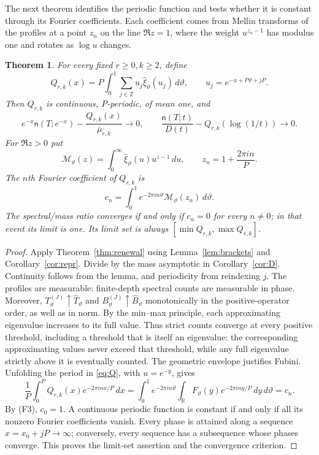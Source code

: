 \documentclass[11pt]{article}
\newtheorem{theorem}{Theorem}[section]
\theoremstyle{definition}
\theoremstyle{remark}
\newcommand{\Z}{\mathbb Z}
\newcommand{\R}{\mathbb R}
\newcommand{\ncount}{\mathsf n}
\begin{document}
The next theorem identifies the periodic function and tests whether it
is constant through its Fourier coefficients. Each coefficient comes
from Mellin transforms of the profiles at a point $z_n$ on the line
$\Re z=1$, where the weight $u^{z_n-1}$ has modulus one and rotates as
$\log u$ changes.
\begin{theorem}\label{thm:periodic}
For every fixed $r\ge0,k\ge2$, define
\begin{equation}\label{eq:Q}
 Q_{r,k}(x)=P\int_0^1\sum_{j\in\Z}
 u_j\widehat\xi_\vartheta(u_j)\,d\vartheta,
 \qquad u_j=e^{-x+P\vartheta+jP}.
\end{equation}
Then $Q_{r,k}$ is continuous, $P$-periodic, of mean one, and
\[
 e^{-x}\ncount(T;e^{-x})-\frac{Q_{r,k}(x)}{\bar\mu_{r,k}}\longrightarrow0,
 \qquad
 \frac{\ncount(T;t)}{D(t)}-Q_{r,k}(\log(1/t))\longrightarrow0.
\]
For $\Re z>0$ put
\[
 \mathcal M_\vartheta(z)=\int_0^\infty
 \widehat\xi_\vartheta(u)u^{z-1}\,du,\qquad
 z_n=1+\frac{2\pi in}{P}.
\]
The $n$th Fourier coefficient of $Q_{r,k}$ is
\begin{equation}\label{eq:cn}
 c_n=\int_0^1e^{-2\pi in\vartheta}
 \mathcal M_\vartheta(z_n)\,d\vartheta.
\end{equation}
The spectral/mass ratio converges if and only if $c_n=0$ for every
$n\ne0$; in that event its limit is one. Its limit set is always
$[\min Q_{r,k},\max Q_{r,k}]$.
\end{theorem}
\begin{proof}
Apply Theorem~\ref{thm:renewal} using Lemma~\ref{lem:brackets} and
Corollary~\ref{cor:repr}. Divide by the mass asymptotic in
Corollary~\ref{cor:D}. Continuity follows from the lemma, and periodicity
from reindexing $j$. The profiles are measurable: finite-depth spectral
counts are measurable in phase. Moreover,
$T_\vartheta^{(J)}\uparrow\widehat T_\vartheta$ and
$B_\vartheta^{(J)}\uparrow\widehat B_\vartheta$ monotonically in the
positive-operator order, as well as in norm. By the min--max principle,
each approximating eigenvalue increases to its full value. Thus strict
counts converge at every positive threshold, including a threshold
that is itself an eigenvalue: the corresponding approximating values
never exceed that threshold, while any full eigenvalue strictly above
it is eventually counted. The geometric envelope justifies Fubini.
Unfolding the period in \eqref{eq:Q}, with $u=e^{-y}$, gives
\[
 \frac1P\int_0^P Q_{r,k}(x)e^{-2\pi inx/P}\,dx
 =\int_0^1e^{-2\pi in\vartheta}
 \int_\R F_\vartheta(y)e^{-2\pi iny/P}\,dy\,d\vartheta
 =c_n.
\]
By (F3), $c_0=1$. A continuous periodic function is constant if and
only if all its nonzero Fourier coefficients vanish. Every phase is
attained along a sequence $x=x_0+jP\to\infty$; conversely, every
sequence has a subsequence whose phases converge. This proves the
limit-set assertion and the convergence criterion.
\end{proof}
\end{document}
